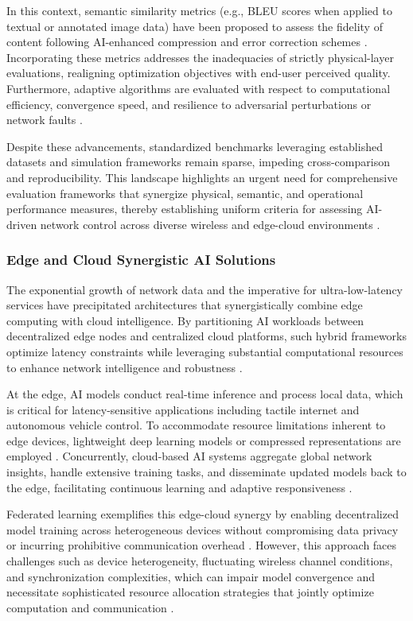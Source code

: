 \documentclass[sigconf]{acmart}
\begin{document}
In this context, semantic similarity metrics (e.g., BLEU scores when applied to textual or annotated image data) have been proposed to assess the fidelity of content following AI-enhanced compression and error correction schemes \cite{ref1,ref3,ref50}. Incorporating these metrics addresses the inadequacies of strictly physical-layer evaluations, realigning optimization objectives with end-user perceived quality. Furthermore, adaptive algorithms are evaluated with respect to computational efficiency, convergence speed, and resilience to adversarial perturbations or network faults \cite{ref5,ref7,ref10}.

Despite these advancements, standardized benchmarks leveraging established datasets and simulation frameworks remain sparse, impeding cross-comparison and reproducibility. This landscape highlights an urgent need for comprehensive evaluation frameworks that synergize physical, semantic, and operational performance measures, thereby establishing uniform criteria for assessing AI-driven network control across diverse wireless and edge-cloud environments \cite{ref50}.

\subsubsection{Edge and Cloud Synergistic AI Solutions}

The exponential growth of network data and the imperative for ultra-low-latency services have precipitated architectures that synergistically combine edge computing with cloud intelligence. By partitioning AI workloads between decentralized edge nodes and centralized cloud platforms, such hybrid frameworks optimize latency constraints while leveraging substantial computational resources to enhance network intelligence and robustness \cite{ref8,ref9,ref13,ref16,ref49,ref50}.

At the edge, AI models conduct real-time inference and process local data, which is critical for latency-sensitive applications including tactile internet and autonomous vehicle control. To accommodate resource limitations inherent to edge devices, lightweight deep learning models or compressed representations are employed \cite{ref8,ref13}. Concurrently, cloud-based AI systems aggregate global network insights, handle extensive training tasks, and disseminate updated models back to the edge, facilitating continuous learning and adaptive responsiveness \cite{ref9,ref16}.

Federated learning exemplifies this edge-cloud synergy by enabling decentralized model training across heterogeneous devices without compromising data privacy or incurring prohibitive communication overhead \cite{ref10}. However, this approach faces challenges such as device heterogeneity, fluctuating wireless channel conditions, and synchronization complexities, which can impair model convergence and necessitate sophisticated resource allocation strategies that jointly optimize computation and communication \cite{ref9,ref10}.
\end{document}
